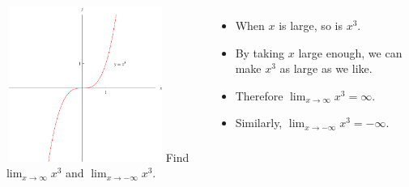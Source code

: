 \begin{frame}
\begin{example}%
\begin{columns}[c]
\ \includegraphics[width=5cm]{curve-sketching/pictures/01-02-xcubed.pdf}%
%
Find $\lim_{x\to\infty} x^3$ and $\lim_{x\to -\infty} x^3$.
\begin{itemize}
\item<2->  When $x$ is large, so is $x^3$.
\item<3->  By taking $x$ large enough, we can make $x^3$ as large as we like.
\item<4->  Therefore $\lim_{x\to \infty} x^3 = \infty$.
\item<5->  Similarly, $\lim_{x\to -\infty} x^3 = -\infty$.
\end{itemize}
\end{columns}
\end{example}
\end{frame}
